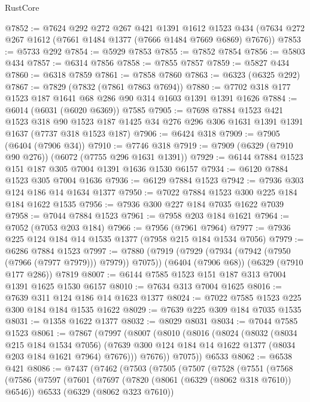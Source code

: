 \begin{lexlean}{RustCore}
\begin{coremodule}
@7852 := @7624
    @292
    @272
    @267
    @421
    @1391
    @1612
    @1523
    @434
    (@7634 @272 @267 @1612 (@7661 @1484 @1377 (@7666 @1484 @7669 @6869) @7676))
@7853 := @5733 @292
@7854 := @5929 @7853
@7855 := @7852 @7854
@7856 := @5803 @434
@7857 := @6314 @7856
@7858 := @7855 @7857
@7859 := @5827 @434
@7860 := @6318 @7859
@7861 := @7858 @7860
@7863 := @6323 (@6325 @292)
@7867 := @7829 (@7832 (@7861 @7863 @7694))
@7880 := @7702 @318 @177 @1523 @187 @1641 @68 @286 @90 @314 @1603 @1391 @1391 @1626
@7884 := @6014 (@6031 (@6020 @6369)) @7585
@7905 := @7698
    @7884
    @1523
    @421
    @1523
    @318
    @90
    @1523
    @187
    @1425
    @34
    @276
    @296
    @306
    @1631
    @1391
    @1391
    @1637
    (@7737 @318 @1523 @187)
@7906 := @6424 @318
@7909 := @7905 (@6404 (@7906 @34))
@7910 := @7746 @318
@7919 := @7909 (@6329 (@7910 @90 @276)) (@6072 (@7755 @296 @1631 @1391))
@7929 := @6144 @7884 @1523 @151 @187 @305 @7004 @1391 @1636 @1530 @6157
@7934 := @6120 @7884 @1523 @305 @7004 @1636
@7936 := @6129 @7884 @1523
@7942 := @7936 @303 @124 @186 @14 @1634 @1377
@7950 := @7022 @7884 @1523 @300 @225 @184 @184 @1622 @1535
@7956 := @7936 @300 @227 @184 @7035 @1622 @7039
@7958 := @7044 @7884 @1523
@7961 := @7958 @203 @184 @1621
@7964 := @7052 (@7053 @203 @184)
@7966 := @7956 (@7961 @7964)
@7977 := @7936 @225 @124 @184 @14 @1535 @1377 (@7958 @215 @184 @1534 @7056)
@7979 := @6286 @7884 @1523
@7997 := @7880
    (@7919 (@7929 (@7934 (@7942 (@7950 (@7966 (@7977 @7979))) @7979)) @7075))
    (@6404 (@7906 @68))
    (@6329 (@7910 @177 @286))
    @7819
@8007 := @6144 @7585 @1523 @151 @187 @313 @7004 @1391 @1625 @1530 @6157
@8010 := @7634 @313 @7004 @1625
@8016 := @7639 @311 @124 @186 @14 @1623 @1377
@8024 := @7022 @7585 @1523 @225 @300 @184 @184 @1535 @1622
@8029 := @7639 @225 @309 @184 @7035 @1535
@8031 := @1358 @1622 @1377
@8032 := @8029 @8031
@8034 := @7044 @7585 @1523
@8061 := @7867
    (@7997
      (@8007
        (@8010
          (@8016
            (@8024
              (@8032
                (@8034 @215 @184 @1534 @7056)
                (@7639 @300 @124 @184 @14 @1622 @1377 (@8034 @203 @184 @1621 @7964) @7676)))
            @7676))
        @7075))
    @6533
@8062 := @6538 @421
@8086 := @7437
    (@7462
      (@7503
        (@7505
          (@7507
            (@7528
              (@7551
                (@7568
                  (@7586
                    (@7597
                      (@7601
                        (@7697
                          (@7820 (@8061 (@6329 (@8062 @318 @7610)) @6546))
                          @6533
                          (@6329 (@8062 @323 @7610))

\end{coremodule}
\end{lexlean}
